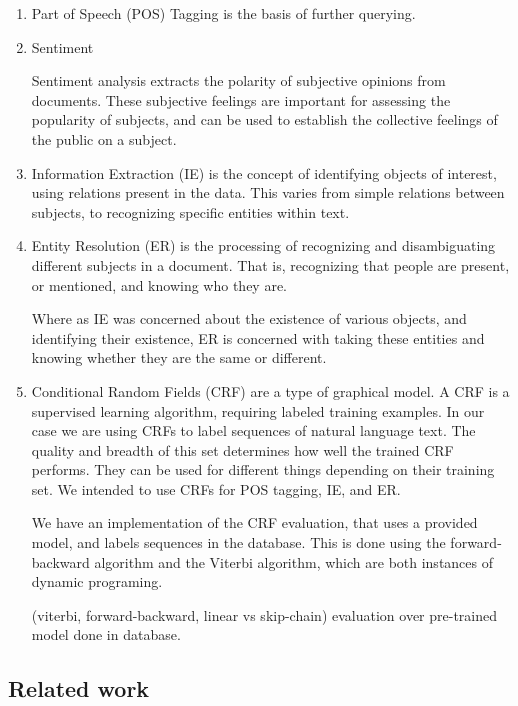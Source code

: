 \documentclass{article}
\begin{document}
\begin{enumerate}
\begin{enumerate}
  \item Part of Speech (POS) Tagging is the basis of further querying.


  \item Sentiment

    Sentiment analysis extracts the polarity of subjective opinions from documents.
    These subjective feelings are important for assessing the popularity of subjects,
    and can be used to establish the collective feelings of the public on a subject.

  \item Information Extraction (IE) is the concept of identifying objects of interest,
    using relations present in the data.
    This varies from simple relations between subjects,
    to recognizing specific entities within text.


  \item Entity Resolution (ER) is the processing of recognizing and disambiguating different subjects in a document.
    That is, recognizing that people are present,
    or mentioned, and knowing who they are.

    Where as IE was concerned about the existence of various objects,
    and identifying their existence,
    ER is concerned with taking these entities and knowing whether they are the same or different.


  \item Conditional Random Fields (CRF) are a type of graphical model.
    A CRF is a supervised learning algorithm, requiring labeled training examples.
    In our case we are using CRFs to label sequences of natural language text.
    The quality and breadth of this set determines how well the trained CRF performs.
    They can be used for different things depending on their training set.
    We intended to use CRFs for POS tagging, IE, and ER.

    We have an implementation of the CRF evaluation, that uses a provided model, and labels sequences in the database.
    This is done using the forward-backward algorithm and the Viterbi algorithm, which are both instances of dynamic programing.

    (viterbi, forward-backward, linear vs skip-chain) evaluation over pre-trained model done in database.

  \end{enumerate}
  \subsection{Related work}


\end{enumerate}
\end{document}
